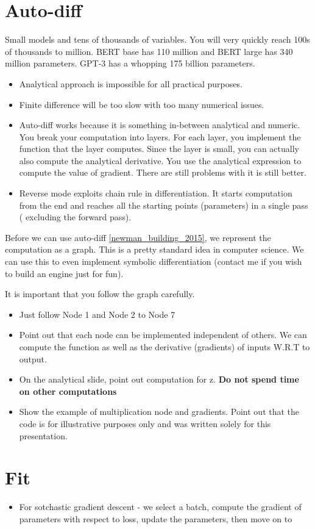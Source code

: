 \documentclass[14pt, twocolumn]{article}
\begin{document}
\section*{Auto-diff}
Small models and tens of thousands of variables. You will very quickly reach 
100s of thousands to million. BERT base has 110 million and BERT large has 
340 million parameters. GPT-3 has a whopping 175 billion parameters. 
\begin{itemize}
	\item Analytical approach is impossible for all practical purposes. 
	\item Finite difference will be too slow with too many numerical issues. 
	\item Auto-diff works because it is something in-between analytical and 
	numeric. You break your computation into layers. For each layer, you implement 
	the function that the layer computes. Since the layer is small, you can actually 
	also compute the analytical derivative. You use the analytical expression to 
	compute the value of gradient. There are still problems with it is still better. 
	\item Reverse mode exploits chain rule in differentiation. It starts computation 
	from the end and reaches all the starting points (parameters) in a single pass (
	excluding the forward pass).  
\end{itemize}
Before we can use auto-diff \ref{newman_building_2015}, we represent the computation as a graph. This is a pretty 
standard idea in computer science. We can use this to even implement symbolic 
differentiation (contact me if you wish to build an engine just for fun). 

It is important  that you follow the graph carefully. 

\begin{itemize}
	\item Just follow Node 1 and Node 2 to Node 7
	\item Point out that each node can be implemented independent of others. We 
	can compute the function as well as the derivative (gradients) of inputs W.R.T
	to output. 
	\item On the analytical slide, point out computation for z. {\bf Do not spend 
	time on other computations}
	\item Show the example of multiplication node and gradients. Point out that 
	the code is for illustrative purposes only and was written solely for this 
	presentation.
\end{itemize}

\section*{Fit}
\begin{itemize}
	\item For sotchastic gradient  descent - we select a batch, compute the gradient 
	of parameters with respect to loss, update the parameters, then move on to
\end{itemize}

\nocite{dumoulin2018guide}
\nocite{726791}
 

\end{document}
